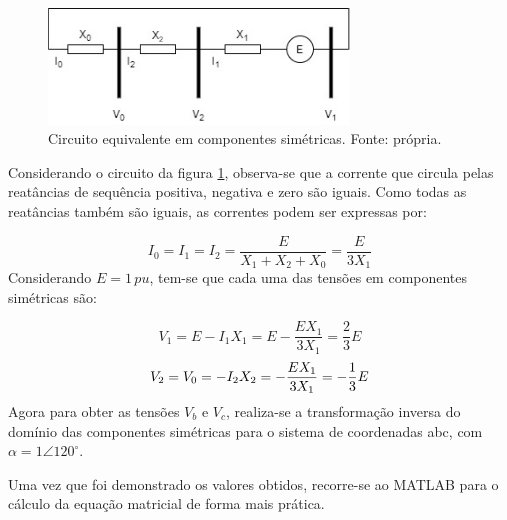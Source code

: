 \begin{figure}[H]
\begin{center}
\includegraphics[width=8cm]{images/cc_1.jpg}
\caption{Circuito equivalente em componentes simétricas. Fonte: própria.}
\label{top4:fig:1} 
\end{center}
\end{figure}

Considerando o circuito da figura \ref{top4:fig:1}, observa-se que a corrente que circula pelas reatâncias de sequência positiva, negativa e zero são iguais. Como todas as reatâncias também são iguais, as correntes podem ser expressas por:

\begin{equation}
I_0 = I_1 = I_2 = \frac{E}{X_1+X_2+X_0} = \frac{E}{3X_1}  
\end{equation}
Considerando $E = 1 \, pu$, tem-se que cada uma das tensões em componentes simétricas são:

\begin{equation}
V_1 = E - I_1X_1 = E - \frac{EX_1}{3X_1} = \frac{2}{3}E 
\end{equation}
\begin{equation}
V_2 = V_0 = - I_2X_2 = -\frac{EX_1}{3X_1} = -\frac{1}{3}E \\
\end{equation}
Agora para obter as tensões $V_b$ e $V_c$, realiza-se a transformação inversa do domínio das componentes simétricas para o sistema de coordenadas abc, com $\alpha = 1 \angle 120^{\circ} $.

Uma vez que foi demonstrado os valores obtidos, recorre-se ao MATLAB para o cálculo da equação matricial de forma mais prática.




